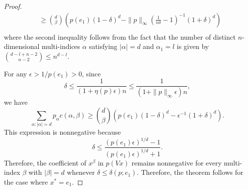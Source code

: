 \documentclass[12pt]{article}
\theoremstyle{remark}
\begin{document}
\begin{proof}
\[\begin{aligned}
&\ge\binom{d}{\beta}\left(p(e_1)(1-\delta)^d-\|p\|_{\infty}\left(\frac{1}{n\delta}-1\right)^{-1}(1+\delta)^d\right)\\
\end{aligned}\]
where the second inequality follows from the fact that the number of distinct $n$-dimensional multi-indices $\alpha$ satisfying $|\alpha|=d$ and $\alpha_1=l$ is given by $\binom{d-l+n-2}{n-2}\le n^{d-l}$. 

For any $\epsilon>1/p(e_1)>0$, since
$$\delta\le \frac{1}{(1+\eta(p)\epsilon)n}\le \frac{1}{(1+\|p\|_{\infty}\epsilon)n},$$
we have
\[\sum_{\alpha:|\alpha|=d}p_{\alpha}c(\alpha,\beta)\ge 
\binom{d}{\beta}\left(p(e_1)(1-\delta)^d-\epsilon^{-1}(1+\delta)^d\right).
\]
This expression is nonnegative because
$$\delta\le \frac{(p(e_1)\epsilon)^{1/d}-1}{(p(e_1)\epsilon)^{1/d}+1}.$$
Therefore, the coefficient of $x^{\beta}$ in $p(Vx)$ remains nonnegative for every multi-index $\beta$ with $|\beta|=d$ whenever $\delta\le\delta(p;e_1)$. 
Therefore, the theorem follows for the case where $x^*=e_1$.


\end{proof}
\end{document}
